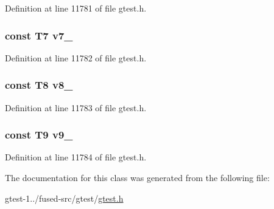 \-Definition at line 11781 of file gtest.\-h.

\hypertarget{classtesting_1_1internal_1_1ValueArray30_a4063f0b7a528133d018ee488ba44a9a3}{
\subsubsection[{v7\-\_\-}]{\setlength{\rightskip}{0pt plus 5cm}const \-T7 {\bf v7\-\_\-}}}\label{db/d20/classtesting_1_1internal_1_1ValueArray30_a4063f0b7a528133d018ee488ba44a9a3}


\-Definition at line 11782 of file gtest.\-h.

\hypertarget{classtesting_1_1internal_1_1ValueArray30_a596bc5260b2474271d1f6910ff6f665d}{
\subsubsection[{v8\-\_\-}]{\setlength{\rightskip}{0pt plus 5cm}const \-T8 {\bf v8\-\_\-}}}\label{db/d20/classtesting_1_1internal_1_1ValueArray30_a596bc5260b2474271d1f6910ff6f665d}


\-Definition at line 11783 of file gtest.\-h.

\hypertarget{classtesting_1_1internal_1_1ValueArray30_a6356e16cf54a9dfac8525f20242af31e}{
\subsubsection[{v9\-\_\-}]{\setlength{\rightskip}{0pt plus 5cm}const \-T9 {\bf v9\-\_\-}}}\label{db/d20/classtesting_1_1internal_1_1ValueArray30_a6356e16cf54a9dfac8525f20242af31e}


\-Definition at line 11784 of file gtest.\-h.



\-The documentation for this class was generated from the following file\-:\begin{DoxyCompactItemize}
\item 
gtest-\/1../fused-\/src/gtest/\hyperlink{fused-src_2gtest_2gtest_8h}{gtest.\-h}\end{DoxyCompactItemize}
